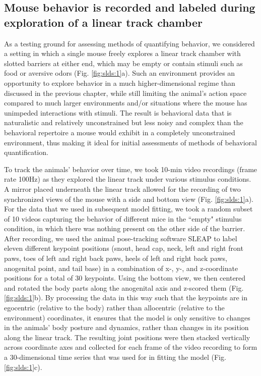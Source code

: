 \subsection{Mouse behavior is recorded and labeled during exploration of a linear track chamber}
\label{sec:slds:3.2.1}

As a testing ground for assessing methods of quantifying behavior, we considered a setting in which a single mouse freely explores a linear track chamber with slotted barriers at either end, which may be empty or contain stimuli such as food or aversive odors (Fig. \ref{fig:slds:1}a). Such an environment provides an opportunity to explore behavior in a much higher-dimensional regime than discussed in the previous chapter, while still limiting the animal's action space compared to much larger environments and/or situations where the mouse has unimpeded interactions with stimuli. The result is behavioral data that is naturalistic and relatively unconstrained but less noisy and complex than the behavioral repertoire a mouse would exhibit in a completely unconstrained environment, thus making it ideal for initial assessments of methods of behavioral quantification. 

To track the animals' behavior over time, we took 10-min video recordings (frame rate 100Hz) as they explored the linear track under various stimulus conditions. A mirror placed underneath the linear track allowed for the recording of two synchronized views of the mouse with a side and bottom view (Fig. \ref{fig:slds:1}a). For the data that we used in subsequent model fitting, we took a random subset of 10 videos capturing the behavior of different mice in the ``empty" stimulus condition, in which there was nothing present on the other side of the barrier. After recording, we used the animal pose-tracking software SLEAP \cite{pereira_sleap_2022} to label eleven different keypoint positions (snout, head cap, neck, left and right front paws, toes of left and right back paws, heels of left and right back paws, anogenital point, and tail base) in a combination of x-, y-, and z-coordinate positions for a total of 30 keypoints. Using the bottom view, we then centered and rotated the body parts along the anogenital axis and z-scored them (Fig. \ref{fig:slds:1}b). By processing the data in this way such that the keypoints are in egocentric (relative to the body) rather than allocentric (relative to the environment) coordinates, it ensures that the model is only sensitive to changes in the animals' body posture and dynamics, rather than changes in its position along the linear track. The resulting joint positions were then stacked vertically across coordinate axes and collected for each frame of the video recording to form a 30-dimensional time series that was used for in fitting the model (Fig. \ref{fig:slds:1}c).

